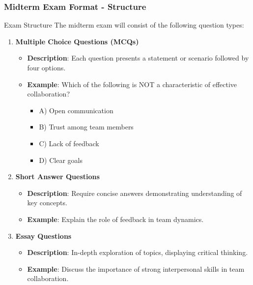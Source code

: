 \documentclass[aspectratio=169]{beamer}
\begin{document}
\begin{frame}[fragile]
    \frametitle{Midterm Exam Format - Structure}
    \begin{block}{Exam Structure}
        The midterm exam will consist of the following question types:
        \begin{enumerate}
            \item \textbf{Multiple Choice Questions (MCQs)}
                \begin{itemize}
                    \item \textbf{Description}: Each question presents a statement or scenario followed by four options.
                    \item \textbf{Example}: Which of the following is NOT a characteristic of effective collaboration?
                    \begin{itemize}
                        \item A) Open communication 
                        \item B) Trust among team members 
                        \item C) Lack of feedback 
                        \item D) Clear goals 
                    \end{itemize}
                \end{itemize}
            \item \textbf{Short Answer Questions}
                \begin{itemize}
                    \item \textbf{Description}: Require concise answers demonstrating understanding of key concepts.
                    \item \textbf{Example}: Explain the role of feedback in team dynamics.
                \end{itemize}
            \item \textbf{Essay Questions}
                \begin{itemize}
                    \item \textbf{Description}: In-depth exploration of topics, displaying critical thinking.
                    \item \textbf{Example}: Discuss the importance of strong interpersonal skills in team collaboration.
                \end{itemize}  
        \end{enumerate}
    \end{block}
\end{frame}
\end{document}
